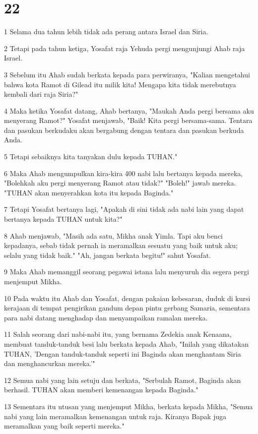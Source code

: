 \chapter{22}

\par 1 Selama dua tahun lebih tidak ada perang antara Israel dan Siria.
\par 2 Tetapi pada tahun ketiga, Yosafat raja Yehuda pergi mengunjungi Ahab raja Israel.
\par 3 Sebelum itu Ahab sudah berkata kepada para perwiranya, "Kalian mengetahui bahwa kota Ramot di Gilead itu milik kita! Mengapa kita tidak merebutnya kembali dari raja Siria?"
\par 4 Maka ketika Yosafat datang, Ahab bertanya, "Maukah Anda pergi bersama aku menyerang Ramot?" Yosafat menjawab, "Baik! Kita pergi bersama-sama. Tentara dan pasukan berkudaku akan bergabung dengan tentara dan pasukan berkuda Anda.
\par 5 Tetapi sebaiknya kita tanyakan dulu kepada TUHAN."
\par 6 Maka Ahab mengumpulkan kira-kira 400 nabi lalu bertanya kepada mereka, "Bolehkah aku pergi menyerang Ramot atau tidak?" "Boleh!" jawab mereka. "TUHAN akan menyerahkan kota itu kepada Baginda."
\par 7 Tetapi Yosafat bertanya lagi, "Apakah di sini tidak ada nabi lain yang dapat bertanya kepada TUHAN untuk kita?"
\par 8 Ahab menjawab, "Masih ada satu, Mikha anak Yimla. Tapi aku benci kepadanya, sebab tidak pernah ia meramalkan sesuatu yang baik untuk aku; selalu yang tidak baik." "Ah, jangan berkata begitu!" sahut Yosafat.
\par 9 Maka Ahab memanggil seorang pegawai istana lalu menyuruh dia segera pergi menjemput Mikha.
\par 10 Pada waktu itu Ahab dan Yosafat, dengan pakaian kebesaran, duduk di kursi kerajaan di tempat pengirikan gandum depan pintu gerbang Samaria, sementara para nabi datang menghadap dan menyampaikan ramalan mereka.
\par 11 Salah seorang dari nabi-nabi itu, yang bernama Zedekia anak Kenaana, membuat tanduk-tanduk besi lalu berkata kepada Ahab, "Inilah yang dikatakan TUHAN, 'Dengan tanduk-tanduk seperti ini Baginda akan menghantam Siria dan menghancurkan mereka.'"
\par 12 Semua nabi yang lain setuju dan berkata, "Serbulah Ramot, Baginda akan berhasil. TUHAN akan memberi kemenangan kepada Baginda."
\par 13 Sementara itu utusan yang menjemput Mikha, berkata kepada Mikha, "Semua nabi yang lain meramalkan kemenangan untuk raja. Kiranya Bapak juga meramalkan yang baik seperti mereka."

